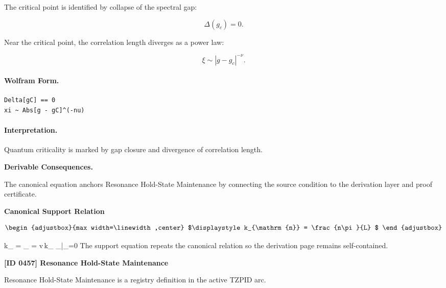 The critical point is identified by collapse of the spectral gap:

\begin{equation}
\Delta(g_c)=0 .
\end{equation}

Near the critical point, the correlation length diverges as a power law:

\begin{equation}
\boxed{
\xi \sim |g-g_c|^{-\nu}.
}
\end{equation}

\paragraph{Wolfram Form.}
\begin{verbatim}
Delta[gC] == 0
xi ~ Abs[g - gC]^(-nu)
\end{verbatim}

\paragraph{Interpretation.}
Quantum criticality is marked by gap closure and divergence of correlation length.
\endgroup

\par\vspace{0.35em}
\noindent\textbf{Derivable Consequences.}\quad
\begingroup
\footnotesize
\raggedright
The canonical equation anchors Resonance Hold-State Maintenance by connecting the source condition to the derivation layer and proof certificate.
\par\endgroup

\noindent\textbf{Canonical Support Relation}\par
\[
\begin{adjustbox}{max width=\linewidth,center}
$\displaystyle
k_{\mathrm{n}} = \frac{n\pi}{L}
$
\end{adjustbox}
\]

\tzpequationlinks
  {k_{} = }
  {\omega_{} = v\,k_{}}
  {\Phi_{}|_{\partial\Omega}=0}
\noindent The support equation repeats the canonical relation so the derivation page remains self-contained.\par

\clearpage
\noindent\textbf{[ID 0457] Resonance Hold-State Maintenance}\par
\vspace{0.35em}
\begingroup\small
{}
Resonance Hold-State Maintenance is a registry definition in the active TZPID arc.

